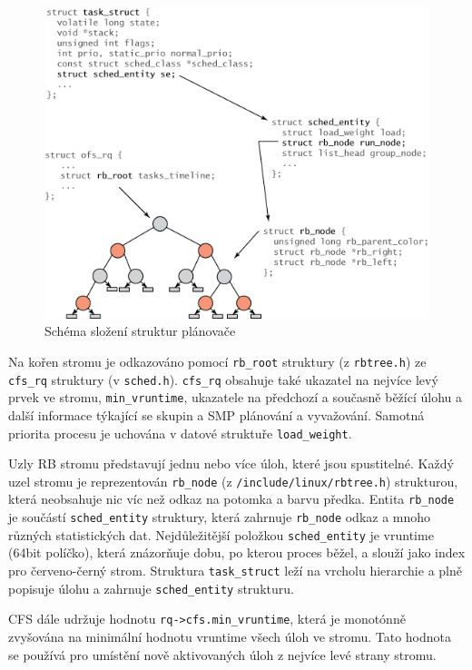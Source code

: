 \documentclass[
  master=true,
  font=sans,
  printversion=false,
  joinlists=true,
  figures=true,
  tables=true,
  sourcecodes=false,
  theorems=false,
  bibencoding=utf8,
  language=czech,
  encoding=utf8,
  field=ainfk,
  biblatex,
  glossaries,
  index
]{kidiplom}
\begin{document}
\begin{figure}[ht]
\includegraphics[scale=1]{obrazky/schedulerStructures.png}
\caption{Schéma složení struktur plánovače}
\label{scheduler structures}
\end{figure}


Na kořen stromu je odkazováno pomocí \verb#rb_root# struktury (z \verb#rbtree.h#) ze \verb#cfs_rq# struktury (v \verb#sched.h#).
\verb#cfs_rq# obsahuje také ukazatel na nejvíce levý prvek ve stromu, \verb#min_vruntime#, ukazatele na předchozí a současně běžící úlohu a další informace týkající se skupin a SMP plánování a vyvažování. Samotná priorita procesu je uchována v datové struktuře \verb#load_weight#. 

Uzly RB stromu představují jednu nebo více úloh, které jsou spustitelné. Každý uzel stromu je reprezentován \verb#rb_node# (z \verb#/include/linux/rbtree.h#) strukturou, která neobsahuje nic víc než odkaz na potomka a barvu předka. Entita \verb#rb_node# je součástí \verb#sched_entity# struktury, která zahrnuje \verb#rb_node# odkaz a mnoho různých statistických dat. Nejdůležitější položkou \verb#sched_entity# je vruntime (64bit políčko), která znázorňuje dobu, po kterou proces běžel, a slouží jako index pro červeno-černý strom. Struktura \verb#task_struct# leží na vrcholu hierarchie a plně popisuje úlohu a zahrnuje \verb#sched_entity# strukturu. 

CFS dále udržuje hodnotu \verb#rq->cfs.min_vruntime#, která je monotónně zvyšována na minimální hodnotu vruntime všech úloh ve stromu. Tato hodnota se používá pro umístění nově aktivovaných úloh z nejvíce levé strany stromu.
\end{document}
